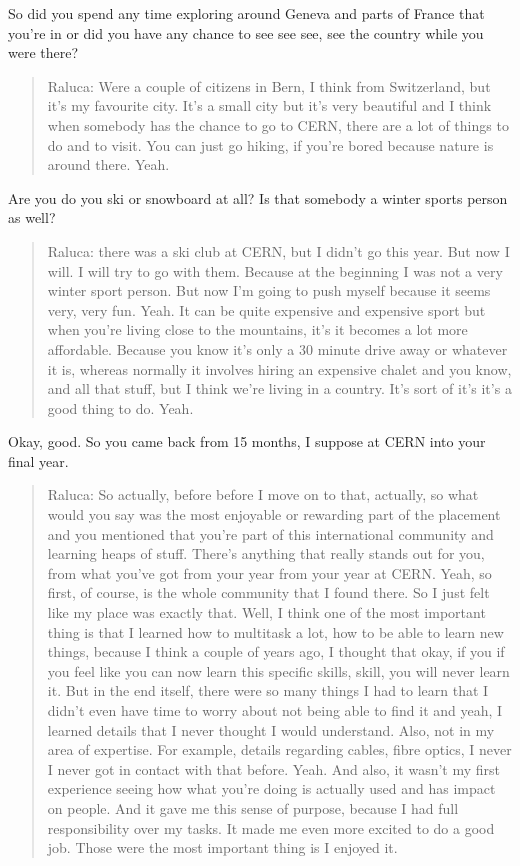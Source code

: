 \documentclass[
]{book}
\begin{document}
So did you spend any time exploring around Geneva and parts of France that you're in or did you have any chance to see see see, see the country while you were there?

\begin{quote}
Raluca: Were a couple of citizens in Bern, I think from Switzerland, but it's my favourite city. It's a small city but it's very beautiful and I think when somebody has the chance to go to CERN, there are a lot of things to do and to visit. You can just go hiking, if you're bored because nature is around there. Yeah.
\end{quote}

Are you do you ski or snowboard at all? Is that somebody a winter sports person as well?

\begin{quote}
Raluca: there was a ski club at CERN, but I didn't go this year. But now I will. I will try to go with them. Because at the beginning I was not a very winter sport person. But now I'm going to push myself because it seems very, very fun. Yeah. It can be quite expensive and expensive sport but when you're living close to the mountains, it's it becomes a lot more affordable. Because you know it's only a 30 minute drive away or whatever it is, whereas normally it involves hiring an expensive chalet and you know, and all that stuff, but I think we're living in a country. It's sort of it's it's a good thing to do. Yeah.
\end{quote}

Okay, good. So you came back from 15 months, I suppose at CERN into your final year.

\begin{quote}
Raluca: So actually, before before I move on to that, actually, so what would you say was the most enjoyable or rewarding part of the placement and you mentioned that you're part of this international community and learning heaps of stuff. There's anything that really stands out for you, from what you've got from your year from your year at CERN. Yeah, so first, of course, is the whole community that I found there. So I just felt like my place was exactly that. Well, I think one of the most important thing is that I learned how to multitask a lot, how to be able to learn new things, because I think a couple of years ago, I thought that okay, if you if you feel like you can now learn this specific skills, skill, you will never learn it. But in the end itself, there were so many things I had to learn that I didn't even have time to worry about not being able to find it and yeah, I learned details that I never thought I would understand. Also, not in my area of expertise. For example, details regarding cables, fibre optics, I never I never got in contact with that before. Yeah. And also, it wasn't my first experience seeing how what you're doing is actually used and has impact on people. And it gave me this sense of purpose, because I had full responsibility over my tasks. It made me even more excited to do a good job. Those were the most important thing is I enjoyed it.
\end{quote}
\end{document}
